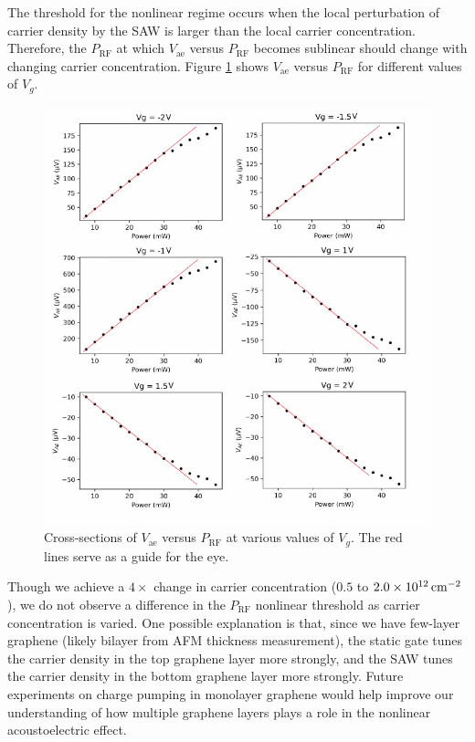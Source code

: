 \documentclass{beavtex_dub_edit}
\begin{document}
The threshold for the nonlinear regime occurs when the local perturbation of carrier density by the SAW is larger than the local carrier concentration. Therefore, the $P_{\mathrm{RF}}$ at which $V_{\mathrm{ae}}$ versus $P_{\mathrm{RF}}$ becomes sublinear should change with changing carrier concentration. Figure \ref{vae vs prf at different vg} shows $V_{\mathrm{ae}}$ versus $P_{\mathrm{RF}}$ for different values of $V_g$. 
\begin{figure}
    \includegraphics[width = 1\textwidth]{vae prf nonlinear at different vg.pdf}
    \caption[Cross-sections of $V_{\mathrm{ae}}$ versus $P_{\mathrm{RF}}$ at various values of $V_g$.]{Cross-sections of $V_{\mathrm{ae}}$ versus $P_{\mathrm{RF}}$ at various values of $V_g$. The red lines serve as a guide for the eye.}
    \label{vae vs prf at different vg}
\end{figure}
Though we achieve a $4\times$ change in carrier concentration ($0.5$ to $\SI{2.0E12}{\centi\meter^{-2}}$), we do not observe a difference in the $P_{\mathrm{RF}}$ nonlinear threshold as carrier concentration is varied. One possible explanation is that, since we have few-layer graphene (likely bilayer from AFM thickness measurement), the static gate tunes the carrier density in the top graphene layer more strongly, and the SAW tunes the carrier density in the bottom graphene layer more strongly. Future experiments on charge pumping in monolayer graphene would help improve our understanding of how multiple graphene layers plays a role in the nonlinear acoustoelectric effect.
\end{document}

